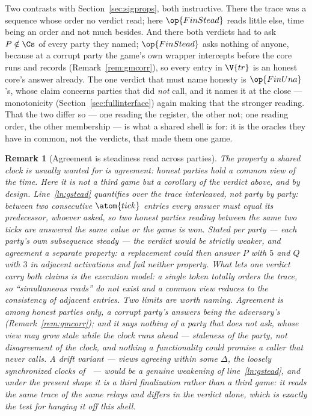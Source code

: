\documentclass[10pt,oneside,openany]{book}
\theoremstyle{accentdef}
\newtheorem{remark}[definition]{Remark}
\theoremstyle{accentplain}
\begin{document}
Two contrasts with Section~\ref{sec:sigprops}, both instructive. There the trace was a sequence
whose order no verdict read; here $\op{FinStead}$ reads little else, time being an order and
not much besides. And there both verdicts had to ask $P \notin \Cs$ of every party they named;
$\op{FinStead}$ asks nothing of anyone, because at a corrupt party the game's own wrapper
intercepts before the core runs and records (Remark~\ref{rem:gmcorr}), so every entry in $\V{tr}$
is an honest core's answer already. The one verdict that must name honesty is $\op{FinUna}$'s,
whose claim concerns parties that did \emph{not} call, and it names it at the close ---
monotonicity (Section~\ref{sec:fullinterface}) again making that the stronger reading. That the
two differ so --- one reading the register, the other not; one reading order, the other
membership --- is what a shared shell is for: it is the oracles they have in common, not the
verdicts, that made them one game.

\begin{remark}[Agreement is steadiness read across parties]\label{rem:clockagree}
The property a shared clock is usually wanted for is \emph{agreement}: honest parties hold a
common view of the time. Here it is not a third game but a corollary of the verdict above, and by
design. Line~\ref{ln:gstead} quantifies over the trace \emph{interleaved}, not party by party:
between two consecutive $\atom{tick}$ entries every answer must equal its predecessor, whoever
asked, so two honest parties reading between the same two ticks are answered the same value or
the game is won. Stated per party --- each party's own subsequence steady --- the verdict would
be strictly weaker, and agreement a separate property: a replacement could then answer $P$ with
$5$ and $Q$ with $3$ in adjacent activations and fail neither property. What lets one verdict carry
both claims is the execution model: a single token totally orders the trace, so ``simultaneous
reads'' do not exist and a common view reduces to the consistency of adjacent entries. Two limits
are worth naming. Agreement is among honest parties only, a corrupt party's answers being the
adversary's (Remark~\ref{rem:gmcorr}); and it says nothing of a party that does not ask, whose
view may grow stale while the clock runs ahead --- staleness of the party, not disagreement of
the clock, and nothing a functionality could promise a caller that never calls. A \emph{drift}
variant --- views agreeing within some $\Delta$, the loosely synchronized clocks
of~\cite{KMTZ13} --- would be a genuine weakening of line~\ref{ln:gstead}, and under the present
shape it is a third finalization rather than a third game: it reads the same trace of the same
relays and differs in the verdict alone, which is exactly the test for hanging it off this shell.
\end{remark}
\end{document}
